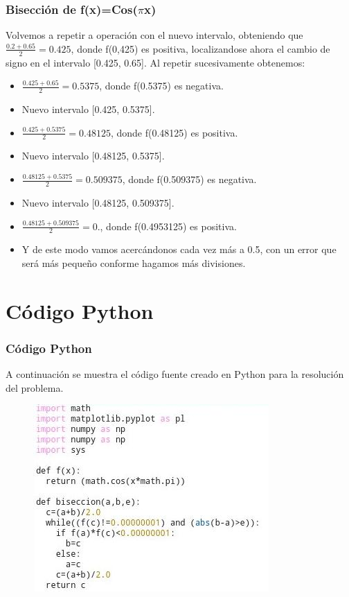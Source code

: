 \documentclass{beamer}
\begin{document}
\begin{frame}
\frametitle{Bisección de f(x)=Cos($\pi$x)}

\begin{block}{}
Volvemos a repetir a operación con el nuevo intervalo, obteniendo que $\frac{0.2+0.65}{2}=0.425$, donde f(0,425) es positiva, localizandose ahora el cambio de signo en el intervalo [0.425, 0.65]. Al repetir sucesivamente obtenemos:
\begin{itemize}

  \item $\frac{0.425+0.65}{2}=0.5375$, donde f(0.5375) es negativa.
  \pause
  \item Nuevo intervalo [0.425, 0.5375].
  \pause
  \item $\frac{0.425+0.5375}{2}=0.48125$, donde f(0.48125) es positiva.
  \pause
  \item Nuevo intervalo [0.48125, 0.5375].
  \pause
  \item $\frac{0.48125+0.5375}{2}=0.509375$, donde f(0.509375) es negativa.
  \pause
  \item Nuevo intervalo [0.48125, 0.509375].
  \pause
  \item $\frac{0.48125+0.509375}{2}=0.$, donde f(0.4953125) es positiva.
  \pause
  \item Y de este modo vamos acercándonos cada vez más a 0.5, con un error que será más pequeño conforme hagamos más divisiones.
\end{itemize}
\end{block}

\end{frame}

\section{Código Python}

\begin{frame}
\frametitle{Código \textsf{Python}}
A continuación se muestra el código fuente creado en \textsf{Python} para la resolución del problema.

\begin{figure}[b]
\begin{center}
\includegraphics[scale=0.75]{python1.jpeg}
\end{center}
\end{figure}
\end{frame}
\end{document}

